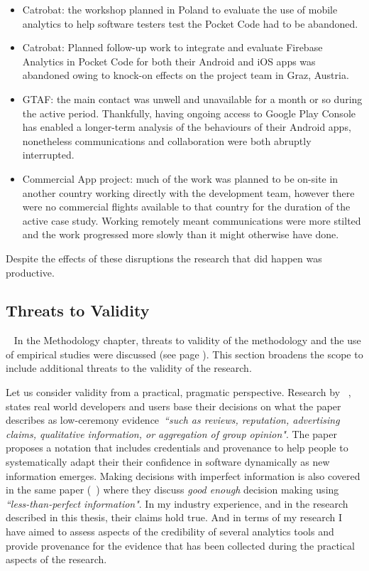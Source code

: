 \begin{itemize}
    \item Catrobat: the workshop planned in Poland to evaluate the use of mobile analytics to help software testers test the Pocket Code had to be abandoned.
    \item Catrobat: Planned follow-up work to integrate and evaluate Firebase Analytics in Pocket Code for both their Android and iOS apps was abandoned owing to knock-on effects on the project team in Graz, Austria. 
    \item GTAF: the main contact was unwell and unavailable for a month or so during the active period. Thankfully, having ongoing access to Google Play Console has enabled a longer-term analysis of the behaviours of their Android apps, nonetheless communications and collaboration were both abruptly interrupted.
    \item Commercial App project: much of the work was planned to be on-site in another country working directly with the development team, however there were no commercial flights available to that country for the duration of the active case study. Working remotely meant communications were more stilted and the work progressed more slowly than it might otherwise have done. 
\end{itemize}

\afterpage{\clearpage}
Despite the effects of these disruptions the research that did happen was productive. 

\subsection{Threats to Validity}~\label{discussion-threats-to-validity-section}
In the Methodology chapter, threats to validity of the methodology and the use of empirical studies were discussed (see page \pageref{methodology-threats-to-validity-section}). This section broadens the scope to include additional threats to the validity of the research.

Let us consider validity from a practical, pragmatic perspective. 
Research by ~, states real world developers and users base their decisions on what the paper describes as low-ceremony evidence~\emph{``such as reviews, reputation, advertising claims, qualitative information, or aggregation of group opinion"}. The paper proposes a notation that includes credentials and provenance to help people to systematically adapt their their confidence in software dynamically as new information emerges. Making decisions with imperfect information is also covered in the same paper (~) where they discuss \emph{good enough} decision making using \emph{``less-than-perfect information"}. In my industry experience, and in the research described in this thesis, their claims hold true. And in terms of my research I have aimed to assess aspects of the credibility of several analytics tools and provide provenance for the evidence that has been collected during the practical aspects of the research.

